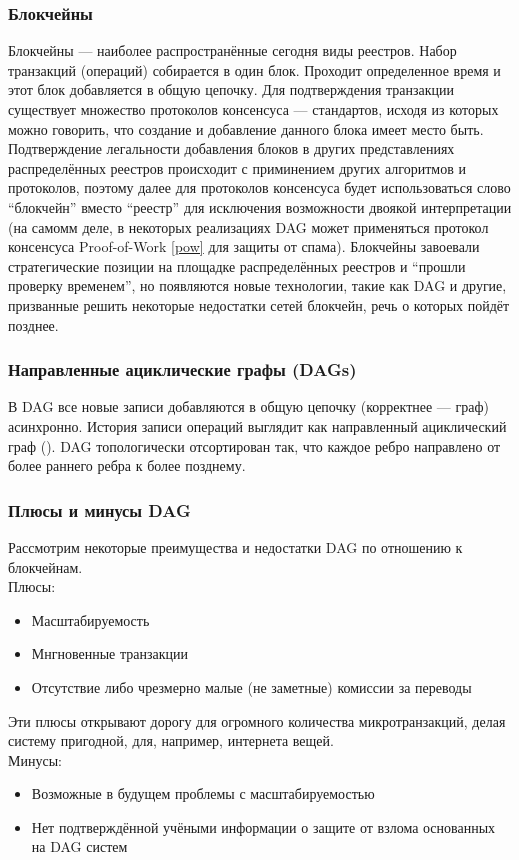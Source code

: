 \subsubsection{Блокчейны}\label{struct_block}
Блокчейны --- наиболее распространённые сегодня виды реестров. Набор транзакций
(операций) собирается в один блок. Проходит определенное время и этот блок
добавляется в общую цепочку. Для подтверждения транзакции существует множество
протоколов консенсуса --- стандартов, исходя из которых можно говорить, что
создание и добавление данного блока имеет место быть. Подтверждение легальности
добавления блоков в других представлениях распределённых реестров происходит с
приминением других алгоритмов и протоколов, поэтому далее для протоколов
консенсуса будет использоваться слово ``блокчейн'' вместо ``реестр'' для
исключения возможности двоякой интерпретации (на самомм деле, в некоторых
реализациях DAG \cite{Popov2018} может применяться протокол консенсуса
Proof-of-Work \ref{pow} для защиты от спама). Блокчейны завоевали
стратегические позиции на площадке распределённых реестров и ``прошли проверку
временем'', но появляются новые технологии, такие как DAG и другие, призванные
решить некоторые недостатки сетей блокчейн, речь о которых пойдёт позднее.

\subsubsection{Направленные ациклические графы (DAGs)}\label{struct_dags}
В DAG все новые записи добавляются в общую цепочку (корректнее --- граф)
асинхронно. История записи операций выглядит как направленный ациклический граф
(\cite{wikii}). DAG топологически отсортирован так, что каждое ребро направлено
от более раннего ребра к более позднему.

\subsubsection{Плюсы и минусы DAG}
Рассмотрим некоторые преимущества и недостатки DAG по отношению к блокчейнам.\\
Плюсы:
\begin{itemize}
    \item Масштабируемость
    \item Мнгновенные транзакции
    \item Отсутствие либо чрезмерно малые (не заметные) комиссии за переводы
\end{itemize}
Эти плюсы открывают дорогу для огромного количества микротранзакций, делая
систему пригодной, для, например, интернета вещей.\\
Минусы:
\begin{itemize}
    \item Возможные в будущем проблемы с масштабируемостью
    \item Нет подтверждённой учёными информации о защите от взлома основанных на DAG систем
\end{itemize}

